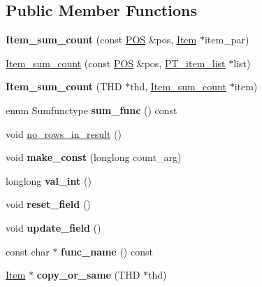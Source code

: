 \subsection*{Public Member Functions}
\begin{DoxyCompactItemize}
\item 
\mbox{\label{classItem__sum__count_a393405a60cd793ea93be158b9cd15d0f}} 
{\bfseries Item\+\_\+sum\+\_\+count} (const \mbox{\hyperlink{structYYLTYPE}{P\+OS}} \&pos, \mbox{\hyperlink{classItem}{Item}} $\ast$item\+\_\+par)
\item 
\mbox{\hyperlink{classItem__sum__count_a57a151ea99647b3a61a757ffb7adc3ae}{Item\+\_\+sum\+\_\+count}} (const \mbox{\hyperlink{structYYLTYPE}{P\+OS}} \&pos, \mbox{\hyperlink{classPT__item__list}{P\+T\+\_\+item\+\_\+list}} $\ast$list)
\item 
\mbox{\label{classItem__sum__count_a8c954509f8e4c8ebb2c6d2116349ae93}} 
{\bfseries Item\+\_\+sum\+\_\+count} (T\+HD $\ast$thd, \mbox{\hyperlink{classItem__sum__count}{Item\+\_\+sum\+\_\+count}} $\ast$item)
\item 
\mbox{\label{classItem__sum__count_a0e4f4f94743a8ebfcf4f57be75bf3f59}} 
enum Sumfunctype {\bfseries sum\+\_\+func} () const
\item 
void \mbox{\hyperlink{classItem__sum__count_a74ba6f4c6812411fa43d9d942d949863}{no\+\_\+rows\+\_\+in\+\_\+result}} ()
\item 
\mbox{\label{classItem__sum__count_a7982a66971620b97764ecef2aff2b3c1}} 
void {\bfseries make\+\_\+const} (longlong count\+\_\+arg)
\item 
\mbox{\label{classItem__sum__count_acfef91bd067613dc0018118df7e820f3}} 
longlong {\bfseries val\+\_\+int} ()
\item 
\mbox{\label{classItem__sum__count_ade1b14b914158bb71d0830caf4a72620}} 
void {\bfseries reset\+\_\+field} ()
\item 
\mbox{\label{classItem__sum__count_a135b06c4ecd634bd6abf235f27693afa}} 
void {\bfseries update\+\_\+field} ()
\item 
\mbox{\label{classItem__sum__count_a7b9b39b8bab5c40c13c10da7747ea165}} 
const char $\ast$ {\bfseries func\+\_\+name} () const
\item 
\mbox{\label{classItem__sum__count_a29359923052eff48a57468c1d7f07302}} 
\mbox{\hyperlink{classItem}{Item}} $\ast$ {\bfseries copy\+\_\+or\+\_\+same} (T\+HD $\ast$thd)
\end{DoxyCompactItemize}
